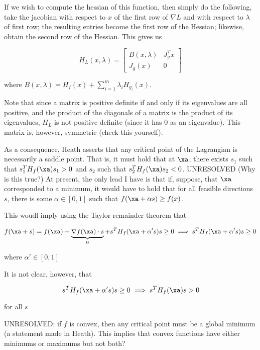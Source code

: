 \documentclass[../main.tex]{subfiles}
\begin{document}
\begin{remark}
    If we wish to compute the hessian of this function, then simply do the following, take the jacobian with respect to $x$ of the first row of $\nabla L$ and with respect to $\lambda$ of first row; the resulting entries become the first row of the Hessian; likewise, obtain the second row of the Hessian. This gives us

    \[
        H_{L}(x, \lambda) = \begin{bmatrix}
            B(x, \lambda) & J_{g}^T x \\
            J_{g}(x) & 0
        \end{bmatrix}
    \]

    where $B(x, \lambda) = H_{f}(x) + \sum_{i=1}^{m}\lambda_{i} H_{g_i}(x)$.

    Note that since a matrix is positive definite if and only if its eigenvalues are all positive, and the product of the diagonals of a matrix is the product of its eigenvalues, $H_{L}$ is not positive definite (since it has $0$ as an eigenvalue). This matrix is, however, symmetric (check this yourself).
\end{remark}


\begin{remark}
    As a consequence, Heath asserts that any critical point of the Lagrangian is necessarily a saddle point. That is, it must hold that at $\xa$, there exists $s_1$ such that $s_1^TH_{f}(\xa)s_1 > 0$ and $s_2$ such that $s_2^TH_{f}(\xa)s_2 < 0$. UNRESOLVED (Why is this true?) At present, the only lead I have is that if, suppose, that $\xa$ corresponded to a minimum, it would have to hold that for all feasible directions $s$, there is some $\alpha \in [0,1]$ such that $f(\xa + \alpha s) \geq f(x)$.

    This woudl imply using the Taylor remainder theorem that

    \[
        f(\xa +s ) = f(\xa) + \underbrace{\nabla f(\xa) \cdot s}_{0} + s^TH_{f}(\xa + \alpha' s)s \geq 0 \implies s^TH_{f}(\xa + \alpha' s)s \geq 0
    \]

    where $\alpha' \in [0,1]$

    It is not clear, however, that

    \[
        s^TH_{f}(\xa + \alpha' s)s \geq 0 \implies s^TH_{f}(\xa)s > 0
    \]

    for all $s$
\end{remark}

\begin{remark}
    UNRESOLVED: if $f$ is convex, then any critical point must be a global minimum (a statement made in Heath). This implies that convex functions have either minimums or maximums but not both?
\end{remark}
\end{document}
